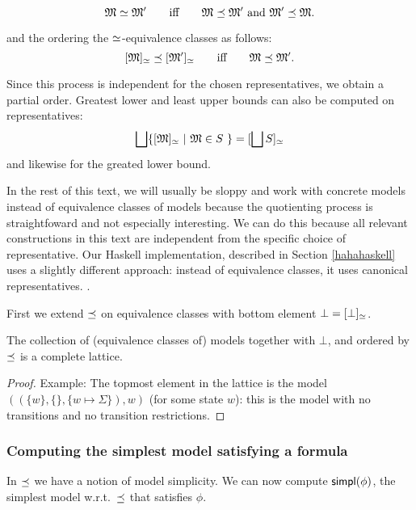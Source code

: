 \[
   \frak{M} \simeq \frak{M}'
      \qquad\text{iff}\qquad
   \frak{M} \preceq \frak{M}' \ \text{and}\ \frak{M}' \preceq \frak{M}.
\]

\NI and the ordering the $\simeq$-equivalence classes as follows:
\[
    [\frak{M}]_{\simeq} \preceq [\frak{M}']_{\simeq}
      \qquad\text{iff}\qquad
    \frak{M} \preceq \frak{M}'.
\]

\NI Since this process is independent for the chosen representatives,
we obtain a partial order. Greatest lower and least upper bounds can also
be computed on representatives:
\[
   \bigsqcup \{[\frak{M}]_{\simeq} \ |\ \frak{M} \in S\ \} = [\bigsqcup S]_{\simeq}
\]
and likewise for the greated lower bound.

In the rest of this text, we will usually be sloppy and work with
concrete models instead of equivalence classes of models because the
quotienting process is straightfoward and not especially
interesting. We can do this because all relevant constructions in this
text are independent from the specific choice of representative.  Our
Haskell implementation, described in Section \ref{hahahaskell} uses a
slightly different approach: instead of equivalence classes, it uses
canonical representatives.  .

First we extend $\preceq$ on equivalence classes with bottom element
$\bot = [\bot]_{\simeq}$.

\begin{theorem}
The collection of (equivalence classes of) models together with
$\bot$, and ordered by $\preceq$ is a complete lattice.
\end{theorem}
\begin{proof}
  Example: The topmost element in the lattice is
the model $( (\{w\}, \{\}, \{w \mapsto \Sigma\}), w)$ (for some state
$w$): this is the model with no transitions and no transition
restrictions.
\end{proof}


\subsubsection{Computing the simplest model satisfying a formula}
\label{simpl}

\NI In $\preceq $ we have a notion of model simplicity.  We can now
compute $\mathsf{simpl}(\phi)$, the simplest model w.r.t.~$\preceq $ that
satisfies $\phi$.

